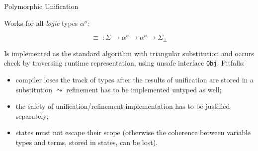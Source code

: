 \documentclass[10pt, mathserif]{beamer}
\newcommand{\oo}[1]{{#1}^o}
\theoremstyle{definition}
\begin{document}
%
%
%
%
%

\begin{frame}[fragile]{Polymorphic Unification}

Works for all \emph{logic} types $\oo{\alpha}$:

$$
\equiv\;\colon \Sigma\to\oo{\alpha}\to\oo{\alpha}\to\Sigma_{\perp}
$$
\pause

Is implemented as the standard algorithm with triangular substitution
and occurs check by traversing runtime representation, using
unsafe interface \lstinline{Obj}.
\pause
\vskip3mm
Pitfalls:

\begin{itemize}
\item compiler loses the track of types after the results of unification
are stored in a substitution $\leadsto$ refinement has to be implemented untyped as well;\pause
\item the safety of unification/refinement implementation has to be justified separately;\pause
\item states must not escape their scope (otherwise the coherence between variable
types and terms, stored in states, can be lost).
\end{itemize}
\end{frame}
\end{document}
